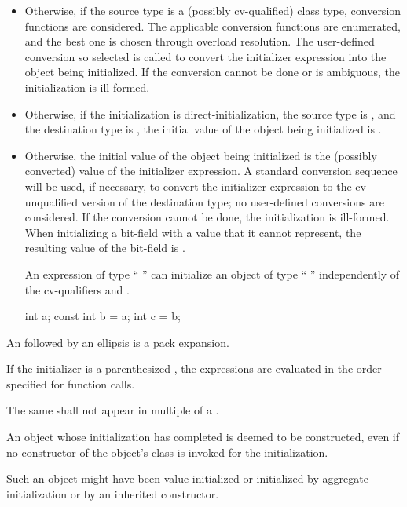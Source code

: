 \begin{itemize}
\item
Otherwise, if the source type
is a (possibly cv-qualified) class type, conversion functions are
considered.
The applicable conversion functions are enumerated,
and the best one is chosen through overload
resolution.
The user-defined conversion so selected
is called to convert the initializer expression into the
object being initialized.
If the conversion cannot be done or is
ambiguous, the initialization is ill-formed.
\item
Otherwise, if the initialization is direct-initialization,
the source type is , and
the destination type is ,
the initial value of the object being initialized is .
\item
Otherwise, the initial value of the object being initialized is
the (possibly converted) value of the initializer expression.
A standard conversion sequence will be used, if necessary,
to convert the initializer expression to the cv-unqualified version of
the destination type;
no user-defined conversions are considered.
If the conversion cannot
be done, the initialization is ill-formed.
When initializing a bit-field with a value that it cannot represent, the
resulting value of the bit-field is
.
%
\begin{note}
An expression of type
`` ''
can initialize an object of type
`` ''
independently of
the cv-qualifiers
and .

\begin{codeblock}
int a;
const int b = a;
int c = b;
\end{codeblock}
\end{note}
\end{itemize}

\pnum
An  followed by an ellipsis is a
pack expansion.

\pnum
If the initializer is a parenthesized ,
the expressions are evaluated in the order
specified for function calls.

\pnum
The same 
shall not appear in multiple  of a
.

\pnum
An object whose initialization has completed
is deemed to be constructed,
even if no constructor of the object's class
is invoked for the initialization.
\begin{note}
Such an object might have been value-initialized
or initialized by aggregate initialization
or by an inherited constructor.
\end{note}

